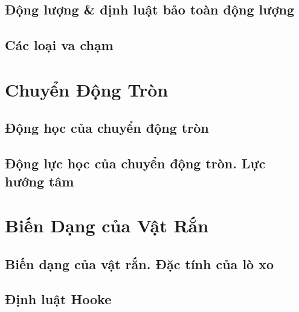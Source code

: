 \documentclass{article}
\numberwithin{equation}{section}
\begin{document}
\subsection{Động lượng \& định luật bảo toàn động lượng}

\subsection{Các loại va chạm}


\section{Chuyển Động Tròn}

\subsection{Động học của chuyển động tròn}

\subsection{Động lực học của chuyển động tròn. Lực hướng tâm}


\section{Biến Dạng của Vật Rắn}

\subsection{Biến dạng của vật rắn. Đặc tính của lò xo}

\subsection{Định luật Hooke}


\printbibliography[heading=bibintoc]
	
\end{document}
